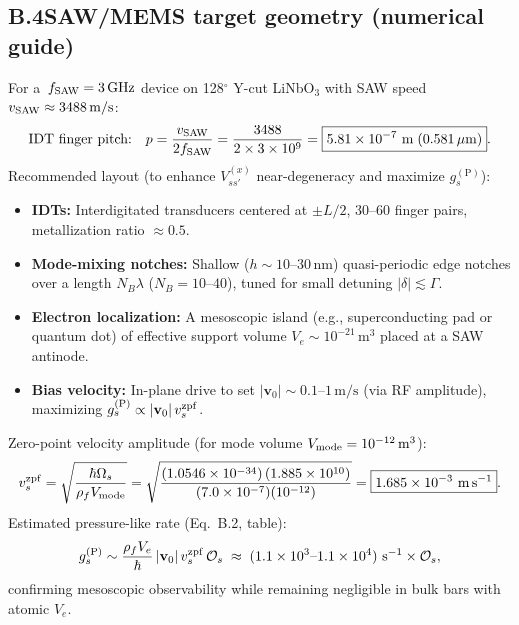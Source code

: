 \documentclass[aps,prb,preprint,amsmath,amssymb]{revtex4-2} %
\newcommand{\rhoF}{\rho_{f}}
\begin{document}
    \subsection*{B.4\quad SAW/MEMS target geometry (numerical guide)}
        For a \(\,f_{\rm SAW}=\SI{3}{GHz}\) device on 128$^\circ$ Y-cut LiNbO\(_3\) with SAW speed \(v_{\rm SAW}\approx \SI{3488}{m/s}\):
        \[
            \text{IDT finger pitch:}\quad p=\frac{v_{\rm SAW}}{2 f_{\rm SAW}}
            =\frac{3488}{2\times 3\times 10^{9}}
            =\boxed{5.81\times 10^{-7}\ \mathrm{m}\;(\SI{0.581}{\mu m})}.
        \]
        Recommended layout (to enhance \(V^{(x)}_{ss'}\) near-degeneracy and maximize \(g_s^{(\mathrm P)}\)):
        \begin{itemize}\itemsep2pt
        \item \textbf{IDTs:} Interdigitated transducers centered at \(\pm L/2\), 30–60 finger pairs, metallization ratio \(\approx 0.5\).
        \item \textbf{Mode-mixing notches:} Shallow (\(h\sim\!10\text{–}30\,\mathrm{nm}\)) quasi-periodic edge notches over a length \(N_B\lambda\) (\(N_B\!=\!10\text{–}40\)), tuned for small detuning \(|\delta|\lesssim \Gamma\).
        \item \textbf{Electron localization:} A mesoscopic island (e.g., superconducting pad or quantum dot) of effective support volume \(V_e\sim 10^{-21}\,\mathrm{m^3}\) placed at a SAW antinode.
        \item \textbf{Bias velocity:} In-plane drive to set \(|\mathbf v_0|\sim 0.1\text{–}1\,\mathrm{m/s}\) (via RF amplitude), maximizing \(g_s^{(\mathrm P)}\propto |\mathbf v_0|\,v_s^{\rm zpf}\).
        \end{itemize}
        Zero-point velocity amplitude (for mode volume \(V_{\rm mode}=10^{-12}\,\mathrm{m^3}\)):
        \[
            v_s^{\rm zpf}=\sqrt{\frac{\hbar \Omega_s}{\rhoF V_{\rm mode}}}
            =\sqrt{\frac{(1.0546\times10^{-34})\,(1.885\times10^{10})}{(7.0\times10^{-7})(10^{-12})}}
            =\boxed{1.685\times 10^{-3}\ \mathrm{m\,s^{-1}}}.
        \]
        Estimated pressure-like rate (Eq.~B.2, table):
        \[
            g_s^{(\mathrm P)}\sim \frac{\rhoF V_e}{\hbar}\,|\mathbf v_0|\,v_s^{\rm zpf}\,\mathcal O_s
            \;\approx\; (1.1\times10^{3}\text{–}1.1\times10^{4})\ \mathrm{s^{-1}}\times \mathcal O_s,
        \]
        confirming mesoscopic observability while remaining negligible in bulk bars with atomic \(V_e\).
\end{document}
